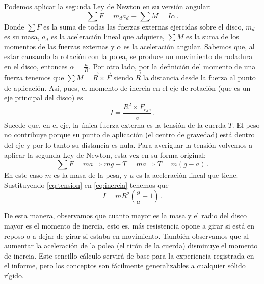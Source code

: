 \documentclass[a4paper]{article}
\begin{document}
Podemos aplicar la segunda Ley de Newton en su versión angular:
\begin{equation}
\sum F=m_d a_d\equiv \sum M=I\alpha\,.
\end{equation}
Donde $\sum F$ es la suma de todas las fuerzas externas ejercidas sobre el disco, $m_d$ es su masa, $a_d$ es la aceleración lineal que adquiere, $\sum M$ es la suma de los momentos de las fuerzas externas  y $\alpha$ es la aceleración angular.
Sabemos que, al estar causando la rotación con la polea, se produce un movimiento de rodadura en el disco, entonces $\alpha=\frac{a}{R}$. Por otro lado, por la definición del momento de una fuerza tenemos que $\sum M=\vec{R}\times\vec{F}$ siendo $\vec{R}$ la distancia desde la fuerza al punto de aplicación. Así, pues, el momento de inercia en el eje de rotación (que es un eje principal del disco) es 
\begin{equation}
I=\frac{R^2\times F_{eje}}{a}\,.
\label{eq:inercia}
\end{equation}
Sucede que, en el eje, la única fuerza externa es la tensión de la cuerda $T$. El peso no contribuye porque su punto de aplicación (el centro de gravedad) está dentro del eje y por lo tanto su distancia es nula. Para averiguar la tensión volvemos a aplicar la segunda Ley de Newton, esta vez en su forma original:
\begin{equation}
\sum F=ma\Rightarrow mg-T=ma\Rightarrow T=m\left(g-a\right)\,.
\label{eq:tension}
\end{equation}
En este caso $m$ es la masa de la pesa, y $a$ es la aceleración lineal que tiene. Sustituyendo \eqref{eq:tension} en \eqref{eq:inercia} tenemos que 
\begin{equation}
I=mR^2\left(\frac{g}{a}-1\right)\,.
\label{eq:inerciadisco}
\end{equation}

De esta manera, observamos que cuanto mayor es la masa y el radio del disco mayor es el momento de inercia, esto es, más resistencia opone a girar si está en reposo o a dejar de girar si estaba en movimiento. También observamos que al aumentar la aceleración de la polea (el tirón de la cuerda) disminuye el momento de inercia.
Este sencillo cálculo servirá de base para la experiencia registrada en el informe, pero los conceptos son fácilmente generalizables a cualquier sólido rígido.
\end{document}
